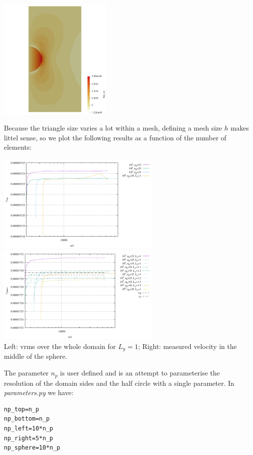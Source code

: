 \begin{center}
\includegraphics[width=5.5cm]{python_codes/fieldstone_92/results/tauxy}
\end{center}

Because the triangle size varies a lot within a mesh, defining a mesh size $h$
makes littel sense, so we plot the following results as a function of the 
number of elements:

\begin{center}
\includegraphics[width=8cm]{python_codes/fieldstone_92/results/vrms}
\includegraphics[width=8cm]{python_codes/fieldstone_92/results/vc}\\
{\captionfont Left: vrms over the whole domain for $L_y=1$; Right: 
measured velocity in the middle of the sphere.}
\end{center}

The parameter $n_p$ is user defined and is an attempt to parameterise 
the resolution of the domain sides and the half circle with a single parameter.
In {\sl parameters.py} we have:
\begin{lstlisting}
np_top=n_p
np_bottom=n_p
np_left=10*n_p
np_right=5*n_p
np_sphere=10*n_p
\end{lstlisting}

